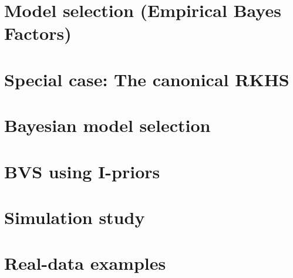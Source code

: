 \documentclass[a4paper,showframe,11pt]{report}
\begin{document}



\section{Model selection (Empirical Bayes Factors)}


\section{Special case: The canonical RKHS}

\section{Bayesian model selection}

\section{BVS using I-priors} 

\section{Simulation study}

\section{Real-data examples}

\hClosingStuffStandalone
\end{document}

